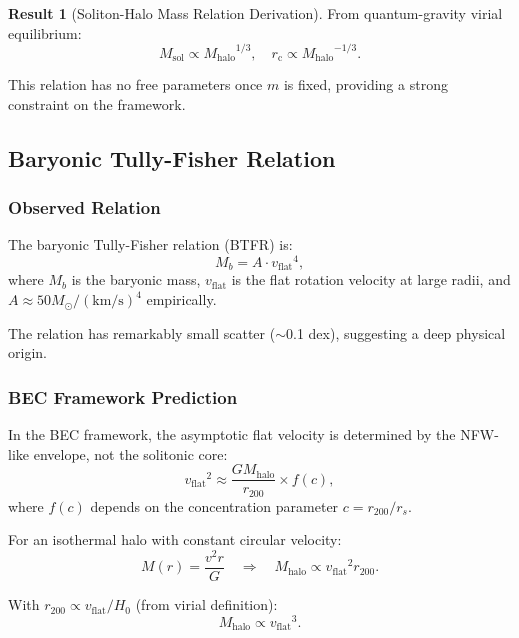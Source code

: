 \documentclass[11pt,a4paper]{article}
\newcommand{\Msun}{\ensuremath{M_\odot}}
\newcommand{\Msol}{\ensuremath{M_{\mathrm{sol}}}}
\newcommand{\Mhalo}{\ensuremath{M_{\mathrm{halo}}}}
\newcommand{\rc}{\ensuremath{r_{\mathrm{c}}}}
\newcommand{\vflat}{\ensuremath{v_{\mathrm{flat}}}}
\theoremstyle{definition}
\newtheorem{result}{Result}[section]
\theoremstyle{remark}
\begin{document}
\begin{result}[Soliton-Halo Mass Relation Derivation]
From quantum-gravity virial equilibrium:
\begin{equation}
\boxed{\Msol \propto \Mhalo^{1/3}, \quad \rc \propto \Mhalo^{-1/3}.}
\end{equation}

This relation has no free parameters once $m$ is fixed, providing a strong constraint on the framework.
\end{result}

\subsection{Baryonic Tully-Fisher Relation}
\label{sec:tully_fisher}

\subsubsection{Observed Relation}

The baryonic Tully-Fisher relation (BTFR) \cite{McGaugh2000} is:
\begin{equation}
M_b = A \cdot \vflat^4,
\end{equation}
where $M_b$ is the baryonic mass, $\vflat$ is the flat rotation velocity at large radii, and $A \approx 50 \Msun/(\text{km/s})^4$ empirically.

The relation has remarkably small scatter ($\sim$0.1 dex), suggesting a deep physical origin.

\subsubsection{BEC Framework Prediction}

In the BEC framework, the asymptotic flat velocity is determined by the NFW-like envelope, not the solitonic core:
\begin{equation}
\vflat^2 \approx \frac{G\Mhalo}{r_{200}} \times f(c),
\end{equation}
where $f(c)$ depends on the concentration parameter $c = r_{200}/r_s$.

For an isothermal halo with constant circular velocity:
\begin{equation}
M(r) = \frac{v^2 r}{G} \quad \Rightarrow \quad \Mhalo \propto \vflat^2 r_{200}.
\end{equation}

With $r_{200} \propto \vflat / H_0$ (from virial definition):
\begin{equation}
\Mhalo \propto \vflat^3.
\end{equation}
\end{document}
